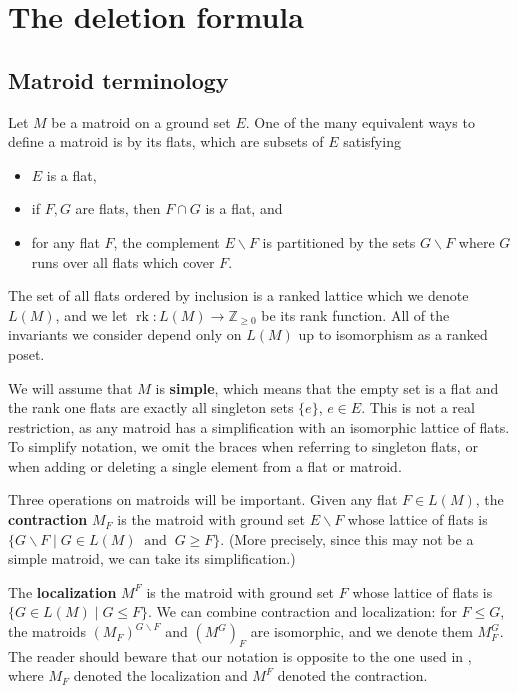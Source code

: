 \documentclass[12pt,reqno]{amsart}
\theoremstyle{definition}
\theoremstyle{remark}
\newcommand{\ssm}{\smallsetminus}
\newcommand{\rk}{\operatorname{rk}}
\newcommand{\Z}{{\mathbb{Z}}}
\renewcommand{\(}{\left(}
\renewcommand{\)}{\right)}
\newcommand{\<}{\left<}
\renewcommand{\>}{\right>}
\renewcommand{\setminus}{\smallsetminus}
\begin{document}
\section{The deletion formula}

\subsection{Matroid terminology}

Let $M$ be a matroid on a ground set $E$.  One of the many equivalent ways to define a matroid is by its flats, which are subsets of $E$ satisfying
\begin{itemize}
\item $E$ is a flat,
\item if $F, G$ are flats, then $F \cap G$ is a flat, and
\item for any flat $F$, the complement $E \ssm F$ is partitioned by the sets $G \ssm F$ where $G$ runs over all flats which cover $F$.
\end{itemize}
The set of all flats ordered by inclusion is a ranked lattice which we denote $L(M)$, and we let $\rk\colon L(M) \to \Z_{\ge 0}$ be its rank function.  All of the invariants we consider depend only on $L(M)$ up to isomorphism as a ranked poset.

We will assume that $M$ is \textbf{simple}, which means that the empty set is a flat and the rank one flats are exactly all singleton sets $\{e\}$, $e\in E$.  This is not a real restriction, as any matroid has a simplification with an isomorphic lattice of flats.  To simplify notation, we omit the braces when referring to singleton flats, or when adding or deleting a single element from a flat or matroid.

Three operations on matroids will be important.  Given any flat $F \in L(M)$, the \textbf{contraction} $M_F$ is the matroid with ground set $E \ssm F$ whose lattice of flats is 
$\{G \setminus F \mid G\in L(M)\ \mbox{ and }\ G\ge F\}$.
(More precisely, since this may not be a simple matroid, we can take its simplification.)

The \textbf{localization} $M^F$
is the matroid with ground set $F$ whose lattice of flats is $\{G \in L(M) \mid G \le F\}$.  We can combine contraction and localization: for $F \le G$, the matroids 
$(M_F)^{G \setminus F}$ and $(M^G)_F$ are isomorphic, and we denote them $M_F^G$.  The reader should beware that our notation is opposite to the one used in \cite{EPW}, where $M_F$ denoted the localization and $M^F$ denoted the contraction.
\end{document}
